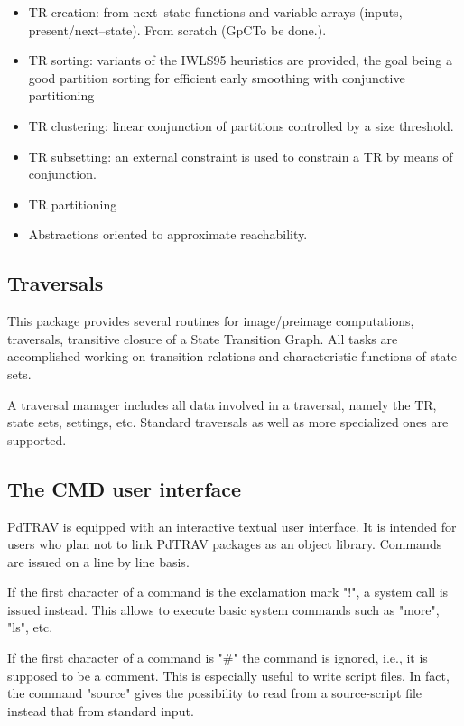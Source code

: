 \begin{itemize}
\item TR creation: from next--state functions and variable arrays
(inputs, present/next--state).
From scratch (GpC{To be done.}).
\item TR sorting: variants of the IWLS95 heuristics are provided, the goal
being a good partition sorting for efficient early smoothing with conjunctive 
partitioning
\item TR clustering: linear conjunction of partitions controlled by a 
size threshold.
\item TR subsetting: an external constraint is used to constrain a TR
by means of conjunction.
\item TR partitioning
\item Abstractions oriented to approximate reachability.
\end{itemize}


\subsection{Traversals}

This package provides several routines for image/preimage computations, 
traversals,
transitive closure of a State Transition Graph. All tasks are accomplished 
working on transition relations and characteristic functions of state sets.

A traversal manager includes all data involved in a traversal, namely the TR,
state sets, settings, etc.
Standard traversals as well as more specialized ones are supported.


\subsection{The CMD user interface}

PdTRAV is equipped with an interactive textual user interface.
It is intended for users who plan not to link PdTRAV packages as an object 
library.
Commands are issued on a line by line basis.

If the first character of a command is the exclamation mark "!", a system
call is issued instead.
This allows to execute basic system commands such as "more", "ls", etc.

If the first character of a command is "\#" the command is ignored, i.e., it
is supposed to be a comment.
This is especially useful to write script files.
In fact, the command "source" gives the possibility to read from a
source-script file instead that from standard input.

